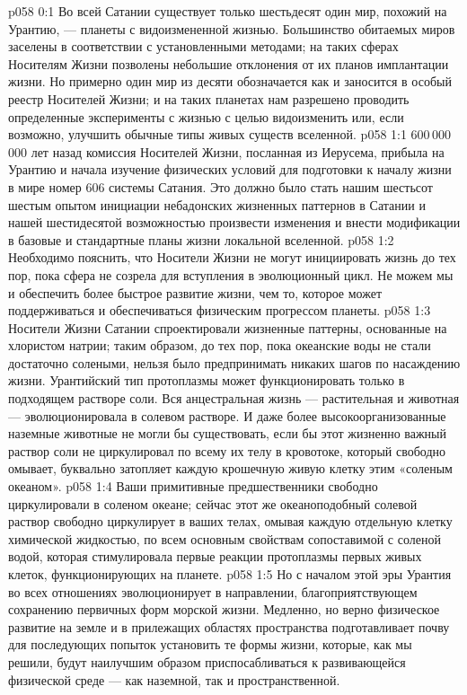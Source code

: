 \author{Носитель Жизни}
\vs p058 0:1 Во всей Сатании существует только шестьдесят один мир, похожий на Урантию, --- планеты с видоизмененной жизнью. Большинство обитаемых миров заселены в соответствии с установленными методами; на таких сферах Носителям Жизни позволены небольшие отклонения от их планов имплантации жизни. Но примерно один мир из десяти обозначается как  и заносится в особый реестр Носителей Жизни; и на таких планетах нам разрешено проводить определенные эксперименты с жизнью с целью видоизменить или, если возможно, улучшить обычные типы живых существ вселенной.
\vs p058 1:1 600\,000\,000 лет назад комиссия Носителей Жизни, посланная из Иерусема, прибыла на Урантию и начала изучение физических условий для подготовки к началу жизни в мире номер 606 системы Сатания. Это должно было стать нашим шестьсот шестым опытом инициации небадонских жизненных паттернов в Сатании и нашей шестидесятой возможностью произвести изменения и внести модификации в базовые и стандартные планы жизни локальной вселенной.
\vs p058 1:2 \pc Необходимо пояснить, что Носители Жизни не могут инициировать жизнь до тех пор, пока сфера не созрела для вступления в эволюционный цикл. Не можем мы и обеспечить более быстрое развитие жизни, чем то, которое может поддерживаться и обеспечиваться физическим прогрессом планеты.
\vs p058 1:3 Носители Жизни Сатании спроектировали жизненные паттерны, основанные на хлористом натрии; таким образом, до тех пор, пока океанские воды не стали достаточно солеными, нельзя было предпринимать никаких шагов по насаждению жизни. Урантийский тип протоплазмы может функционировать только в подходящем растворе соли. Вся анцестральная жизнь --- растительная и животная --- эволюционировала в солевом растворе. И даже более высокоорганизованные наземные животные не могли бы существовать, если бы этот жизненно важный раствор соли не циркулировал по всему их телу в кровотоке, который свободно омывает, буквально затопляет каждую крошечную живую клетку этим «соленым океаном».
\vs p058 1:4 Ваши примитивные предшественники свободно циркулировали в соленом океане; сейчас этот же океаноподобный солевой раствор свободно циркулирует в ваших телах, омывая каждую отдельную клетку химической жидкостью, по всем основным свойствам сопоставимой с соленой водой, которая стимулировала первые реакции протоплазмы первых живых клеток, функционирующих на планете.
\vs p058 1:5 Но с началом этой эры Урантия во всех отношениях эволюционирует в направлении, благоприятствующем сохранению первичных форм морской жизни. Медленно, но верно физическое развитие на земле и в прилежащих областях пространства подготавливает почву для последующих попыток установить те формы жизни, которые, как мы решили, будут наилучшим образом приспосабливаться к развивающейся физической среде --- как наземной, так и пространственной.

